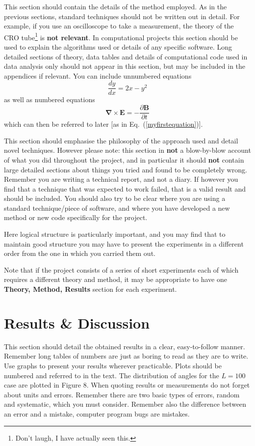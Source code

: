 \documentclass[a4paper,12pt]{article}
\begin{document}
This section should contain the details of the method employed. 
As in the previous sections, standard techniques should not be written
out in detail. For example, if you use an oscilloscope to take a
measurement, the theory of the CRO tube\footnote{Don't laugh, I have actually
seen this.} is {\bf not relevant}. In computational projects this
section should be used to explain the algorithms used or details of any specific 
software. Long detailed sections of theory, data tables
and details of computational code used in data analysis only should not
appear in this section, but may be included in the appendices if relevant. You can
include unnumbered equations
\[
\frac{dy}{dx}=2x-y^2
\]
as well as numbered equations
\begin{equation} \label{myfirstequation}
\mathbf{\nabla}\times\mathbf{E} = -\frac{\partial \mathbf{B}}{\partial t}
\end{equation}
which can then be referred to later [as in Eq.~(\ref{myfirstequation})].

This section should emphasise the philosophy of the approach used
and detail novel techniques. However
please note: this section in {\bf not} a blow-by-blow account of what
you did throughout the project, and in particular it should {\bf not} 
contain large detailed sections about things you tried and found to be
completely wrong. Remember you are writing a technical report, and
not a diary. If however you find that a technique that was expected to
work failed, that is a valid result and should be included. You should 
also try to be clear where you are using a standard technique/piece of 
software, and where you have developed a new method or new code specifically 
for the project.

Here logical structure is particularly important, and you may find that
to maintain good structure you may have to present the experiments
in a different order from the one in which you carried them out.

Note that if the project consists of a series of short experiments
each of which requires a different theory and method, it may be appropriate
to have one {\bf Theory, Method, Results} section for each
experiment.


\section{Results \& Discussion}

This section should detail the obtained results in a clear,
easy-to-follow manner. Remember long tables of numbers are just as boring to
read as they are to write. Use graphs to present your results wherever 
practicable. Plots should be numbered and referred to in the text. 
The distribution of angles for the $L=100$ case are plotted in Figure 8.
When quoting results or measurements do not forget about units and errors. 
Remember there are two basic types of errors, random and systematic, 
which you must consider. Remember also the difference between an error 
and a mistake, computer program bugs are mistakes.
 
\end{document}
